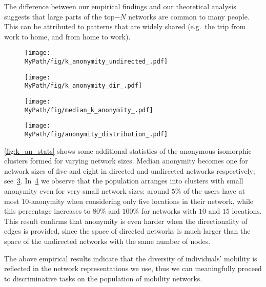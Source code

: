 The difference between our empirical findings and our theoretical analysis suggests that large parts of the top$-N$ networks are common to many people.
This can be attributed to patterns that are widely shared (e.g.\ the trip from work to home, and from home to work).

\begin{figure*}[!t]
	\begin{subfigure}[t]{0.49\textwidth}
		\centering
		\texttt{[image: \\MyPath/fig/k\_anonymity\_undirected\_.pdf]}
		\caption{}
		\label{fig:k_an_un}
	\end{subfigure}%
	\begin{subfigure}[t]{0.49\textwidth}
		\centering
		\texttt{[image: \\MyPath/fig/k\_anonymity\_dir\_.pdf]}
		\caption{}
		\label{fig:k_an_dir}
	\end{subfigure}%
	\caption{{Identifiability set and $k-$anonymity for undirected and directed top$-N$ mobility networks for increasing number of nodes. Displayed is also the theoretical upper bound of identifiability for networks with $ N $ nodes.}
	}
	\label{fig:k_an}
\end{figure*}

\begin{figure*}[!t]
	\begin{subfigure}[t]{0.49\textwidth}
		\centering
		\texttt{[image: \\MyPath/fig/median\_k\_anonymity\_.pdf]}
		\caption{}
		\label{fig:k_an_med}
	\end{subfigure}
	\begin{subfigure}[t]{0.49\textwidth}
		\centering
		\texttt{[image: \\MyPath/fig/anonymity\_distribution\_.pdf]}
		\caption{}
		\label{fig:anon_distribution}
	\end{subfigure}
	\caption{{Anonymity size statistics over the population of top$-N$ mobility networks for increasing network size.}}
	\label{fig:k_an_stats}
\end{figure*}

 \cref{fig:k_an_stats} shows some additional statistics of the anonymous isomorphic clusters formed for varying network sizes.
 Median anonymity becomes one for network sizes of five and eight in directed and undirected networks respectively; see~\cref{fig:k_an_med}.
 In~\cref{fig:anon_distribution} we observe that the population arranges into clusters with small anonymity even for very small network sizes: around $5\%$  of the users have at most $10$-anonymity when considering only five locations in their network, while this percentage increases to $80\%$ and $100\% $ for networks with $10$ and $15$ locations.
 This result confirms that anonymity is even harder when the directionality of edges is provided, since the space of directed networks is much larger than the space of the undirected networks with the same number of nodes.

 The above empirical results indicate that the diversity of individuals' mobility is reflected in the network representations we use, thus we can meaningfully proceed to discriminative tasks on the population of mobility networks.